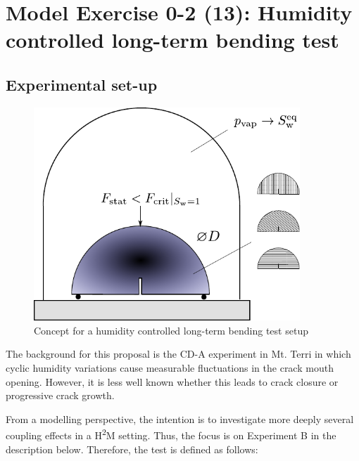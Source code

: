 \section{Model Exercise 0-2 (13): Humidity controlled long-term bending test}
\label{sec:mex13}
\subsection{Experimental set-up}
\begin{figure}
\centering
\includegraphics[width=10cm]{figures/GeomInt_MEx13.pdf}
\caption{Concept for a humidity controlled long-term bending test setup}
\label{fig:GeomInt_MEx13}
\end{figure}
The background for this proposal is the CD-A experiment in Mt. Terri in which cyclic humidity variations cause measurable fluctuations in the crack mouth opening. However, it is less well known whether this leads to crack closure or progressive crack growth. 

From a modelling perspective, the intention is to investigate more deeply several coupling effects in a H\textsuperscript{2}M setting. Thus, the focus is on Experiment B in the description below. Therefore, the test is defined as follows:

